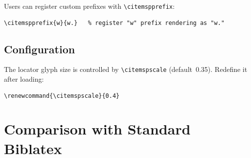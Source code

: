 \documentclass[11pt, a4paper]{article}
\newcommand{\pkg}[1]{\texttt{#1}}
\newcommand{\cmd}[1]{\texttt{\textbackslash #1}}
\begin{document}
%
Users can register custom prefixes with \cmd{citemspprefix}:
\begin{tcolorbox}[colback=gray!5, colframe=gray!40, boxrule=0.5pt, arc=2pt, top=6pt, bottom=6pt, left=10pt, right=10pt]
\begin{verbatim}
\citemspprefix{w}{w.}   % register "w" prefix rendering as "w."
\end{verbatim}
\end{tcolorbox}


\subsection{Configuration}

The locator glyph size is controlled by \cmd{citemspscale} (default~0.35). Redefine it after loading:
%
\begin{tcolorbox}[colback=gray!5, colframe=gray!40, boxrule=0.5pt, arc=2pt, top=6pt, bottom=6pt, left=10pt, right=10pt]
\begin{verbatim}
\renewcommand{\citemspscale}{0.4}
\end{verbatim}
\end{tcolorbox}


\section{Comparison with Standard Biblatex}





\end{document}
